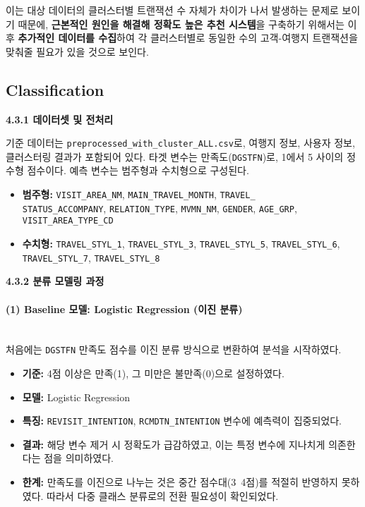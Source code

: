 \documentclass[sigconf]{acmart}
\begin{document}
\begin{CJK}{UTF8}{mj}
이는 대상 데이터의 클러스터별 트랜잭션 수 자체가 차이가 나서 발생하는 문제로 보이기 때문에, \textbf{근본적인 원인을 해결해 정확도 높은 추천 시스템}을 구축하기 위해서는 이후 \textbf{추가적인 데이터를 수집}하여 각 클러스터별로 동일한 수의 고객-여행지 트랜잭션을 맞춰줄 필요가 있을 것으로 보인다.


\subsection{Classification}

\vspace{0.5em}
\noindent\textbf{4.3.1 데이터셋 및 전처리}\par

기준 데이터는 \texttt{preprocessed\_with\_cluster\_ALL.csv}로, 여행지 정보, 사용자 정보, 클러스터링 결과가 포함되어 있다. 타겟 변수는 만족도(\texttt{DGSTFN})로, 1에서 5 사이의 정수형 점수이다. 예측 변수는 범주형과 수치형으로 구성된다.

\begin{itemize}
  \item \textbf{범주형:} \texttt{VISIT\_AREA\_NM}, \texttt{MAIN\_TRAVEL\_MONTH}, \texttt{TRAVEL\_\\STATUS\_ACCOMPANY}, \texttt{RELATION\_TYPE}, \texttt{MVMN\_NM}, \texttt{GENDER}, \texttt{AGE\_GRP}, \texttt{VISIT\_AREA\_TYPE\_CD}
  \item \textbf{수치형:} \texttt{TRAVEL\_STYL\_1}, \texttt{TRAVEL\_STYL\_3}, \texttt{TRAVEL\_STYL\_5}, \texttt{TRAVEL\_STYL\_6}, \texttt{TRAVEL\_STYL\_7}, \texttt{TRAVEL\_STYL\_8}
\end{itemize}

\vspace{0.5em}
\noindent\textbf{4.3.2 분류 모델링 과정}\par

\paragraph{(1) Baseline 모델: Logistic Regression (이진 분류)}\mbox{}\\
처음에는 \texttt{DGSTFN} 만족도 점수를 이진 분류 방식으로 변환하여 분석을 시작하였다.
\begin{itemize}
  \item \textbf{기준:} 4점 이상은 만족(1), 그 미만은 불만족(0)으로 설정하였다.
  \item \textbf{모델:} Logistic Regression
  \item \textbf{특징:} \texttt{REVISIT\_INTENTION}, \texttt{RCMDTN\_INTENTION} 변수에 예측력이 집중되었다.
  \item \textbf{결과:} 해당 변수 제거 시 정확도가 급감하였고, 이는 특정 변수에 지나치게 의존한다는 점을 의미하였다.
  \item \textbf{한계:} 만족도를 이진으로 나누는 것은 중간 점수대(3~4점)를 적절히 반영하지 못하였다. 따라서 다중 클래스 분류로의 전환 필요성이 확인되었다.
\end{itemize}


\end{CJK}
\end{document}
